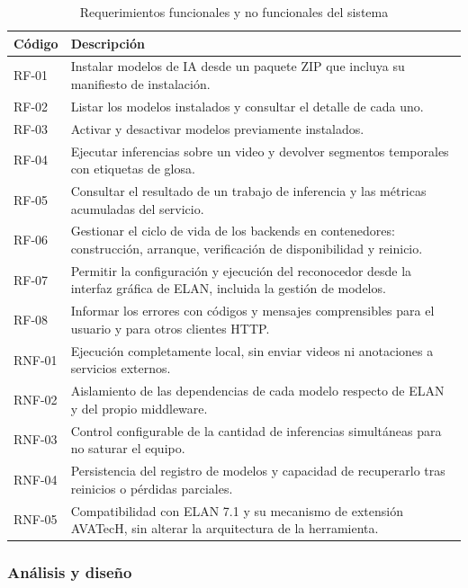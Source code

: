 \documentclass[11pt,a4paper]{article}
\begin{document}
\begin{table}[H]
\centering
\caption{Requerimientos funcionales y no funcionales del sistema}
\label{tab:requerimientos}
\footnotesize
\renewcommand{\arraystretch}{1.18}
\setlength{\tabcolsep}{5pt}

\begin{tabular}{
    >{\centering\arraybackslash}p{1.4cm}
    >{\raggedright\arraybackslash}p{11.6cm}
}
\toprule
\textbf{Código} & \textbf{Descripción} \\
\midrule
RF-01 & Instalar modelos de IA desde un paquete ZIP que incluya su manifiesto de instalación. \\
RF-02 & Listar los modelos instalados y consultar el detalle de cada uno. \\
RF-03 & Activar y desactivar modelos previamente instalados. \\
RF-04 & Ejecutar inferencias sobre un video y devolver segmentos temporales con etiquetas de glosa. \\
RF-05 & Consultar el resultado de un trabajo de inferencia y las métricas acumuladas del servicio. \\
RF-06 & Gestionar el ciclo de vida de los backends en contenedores: construcción, arranque, verificación de disponibilidad y reinicio. \\
RF-07 & Permitir la configuración y ejecución del reconocedor desde la interfaz gráfica de ELAN, incluida la gestión de modelos. \\
RF-08 & Informar los errores con códigos y mensajes comprensibles para el usuario y para otros clientes HTTP. \\
\midrule
RNF-01 & Ejecución completamente local, sin enviar videos ni anotaciones a servicios externos. \\
RNF-02 & Aislamiento de las dependencias de cada modelo respecto de ELAN y del propio middleware. \\
RNF-03 & Control configurable de la cantidad de inferencias simultáneas para no saturar el equipo. \\
RNF-04 & Persistencia del registro de modelos y capacidad de recuperarlo tras reinicios o pérdidas parciales. \\
RNF-05 & Compatibilidad con ELAN 7.1 y su mecanismo de extensión AVATecH, sin alterar la arquitectura de la herramienta. \\
\bottomrule
\end{tabular}
\end{table}

\subsubsection{Análisis y diseño}
\end{document}
